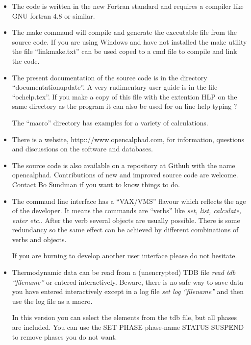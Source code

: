\documentclass[12pt]{article}
\begin{document}
\begin{itemize}
\item The code is written in the new Fortran standard and requires a
  compiler like GNU fortran 4.8 or similar.

\item The make command will compile and generate the executable file
  from the source code.  If you are using Windows and have not
  installed the make utility the file ``linkmake.txt'' can be used
  coped to a cmd file to compile and link the code.

\item The present documentation of the source code is in the directory
  ``documentationupdate''.  A very rudimentary user guide is in the
  file ``ochelp.tex''.  If you make a copy of this file with the
  extention HLP on the same directory as the program it can also be
  used for on line help typing ?

  The ``macro'' directory has examples for a variety of calculations.

\item There is a website, http:://www.opencalphad.com, for
  information, questions and discussions on the software and
  databases.

\item The source code is also available on a repository at Github with
  the name opencalphad.  Contributions of new and improved source code
  are welcome.  Contact Bo Sundman if you want to know things to do.

\item The command line interface has a ``VAX/VMS'' flavour which
  reflects the age of the developer.  It means the commands are
  ``verbs'' like {\em set, list, calculate, enter etc.}.  After the
  verb several objects are usually possible.  There is some redundancy
  so the same effect can be achieved by different combinations of
  verbs and objects.

  If you are burning to develop another user interface please do not
  hesitate.

\item Thermodynamic data can be read from a (unencrypted) TDB file
  {\em read tdb ``filename''} or entered interactively.  Beware, there
  is no safe way to save data you have entered interactively except in
  a log file {\em set log ``filename''} and then use the log file as a
  macro.

  In this version you can select the elements from the tdb file, but
  all phases are included.  You can use the SET PHASE phase-name
  STATUS SUSPEND to remove phases you do not want.


\end{itemize}
\end{document}
